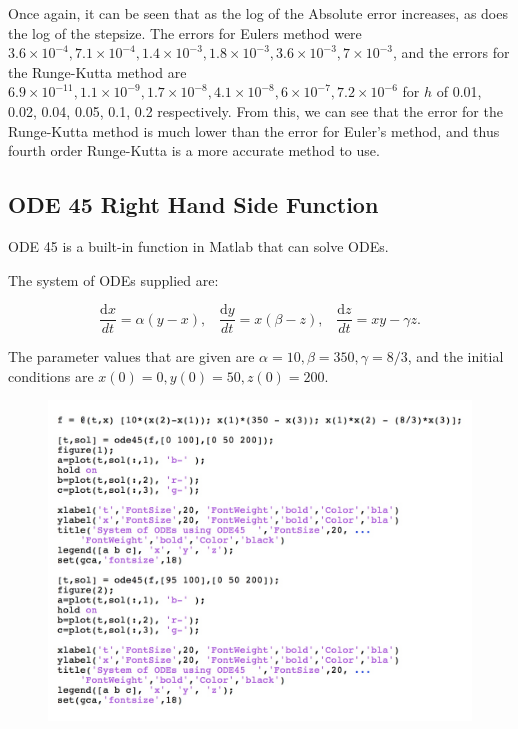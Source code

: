 \documentclass[a4paper]{article}
\begin{document}

Once again, it can be seen that as the log of the Absolute error increases, as does the log of the stepsize. The errors for Eulers method were $3.6 \times 10^{-4}, 7.1\times 10^{-4}, 1.4\times 10^{-3}, 1.8\times 10^{-3}, 3.6\times 10^{-3}, 7\times 10^{-3}$, and the errors for the Runge-Kutta method are $6.9 \times 10^{-11}, 1.1\times 10^{-9}, 1.7\times 10^{-8}, 4.1\times 10^{-8}, 6\times 10^{-7}, 7.2\times 10^{-6}$ for $h$ of 0.01, 0.02, 0.04, 0.05, 0.1, 0.2 respectively. From this, we can see that the error for the Runge-Kutta method is much lower than the error for Euler's method, and thus fourth order Runge-Kutta is a more accurate method to use.  

\subsection{ODE 45 Right Hand Side Function}


ODE 45 is a built-in function in Matlab that can solve ODEs. 

The system of ODEs supplied are:

$$\frac{\mathrm{d}x}{dt} = \alpha(y - x),  \; \; \;   \frac{\mathrm{d}y}{dt} = x(\beta - z),    \; \; \; \frac{\mathrm{d}z}{dt} = xy - \gamma z.$$


The parameter values that are given are $\alpha = 10, \beta = 350, \gamma = 8/3$, and the initial conditions are $x(0) = 0, y(0) = 50, z(0) = 200$. 


\begin{figure}[H]
\includegraphics[width=1\textwidth]{ode45code.jpg}
\end{figure}
\end{document}
